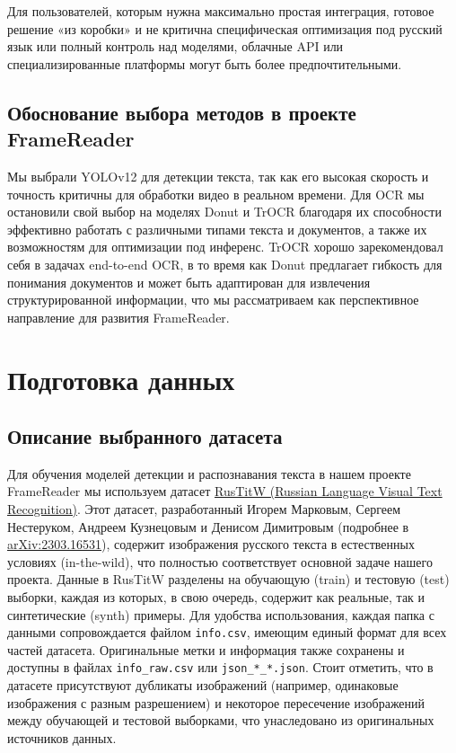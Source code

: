 \documentclass[12pt, a4paper]{article}
\theoremstyle{definition}
\theoremstyle{remark}
\begin{document}
	Для пользователей, которым нужна максимально простая интеграция, готовое решение «из коробки» и не критична специфическая оптимизация под русский язык или полный контроль над моделями, облачные API или специализированные платформы могут быть более предпочтительными.
	
	\subsection{Обоснование выбора методов в проекте FrameReader}
	Мы выбрали YOLOv12 для детекции текста, так как его высокая скорость и точность критичны для обработки видео в реальном времени. Для OCR мы остановили свой выбор на моделях Donut и TrOCR благодаря их способности эффективно работать с различными типами текста и документов, а также их возможностям для оптимизации под инференс. TrOCR хорошо зарекомендовал себя в задачах end-to-end OCR, в то время как Donut предлагает гибкость для понимания документов и может быть адаптирован для извлечения структурированной информации, что мы рассматриваем как перспективное направление для развития FrameReader.
	
	\section{Подготовка данных}
	\subsection{Описание выбранного датасета}
	Для обучения моделей детекции и распознавания текста в нашем проекте FrameReader мы используем датасет \href{https://www.kaggle.com/datasets/hardtype/rustitw-russian-language-visual-text-recognition}{RusTitW (Russian Language Visual Text Recognition)}. Этот датасет, разработанный Игорем Марковым, Сергеем Нестеруком, Андреем Кузнецовым и Денисом Димитровым (подробнее в \href{https://arxiv.org/abs/2303.16531}{arXiv:2303.16531}), содержит изображения русского текста в естественных условиях (in-the-wild), что полностью соответствует основной задаче нашего проекта. Данные в RusTitW разделены на обучающую (train) и тестовую (test) выборки, каждая из которых, в свою очередь, содержит как реальные, так и синтетические (synth) примеры. Для удобства использования, каждая папка с данными сопровождается файлом \texttt{info.csv}, имеющим единый формат для всех частей датасета. Оригинальные метки и информация также сохранены и доступны в файлах \texttt{info\_raw.csv} или \texttt{json\_*\_*.json}. Стоит отметить, что в датасете присутствуют дубликаты изображений (например, одинаковые изображения с разным разрешением) и некоторое пересечение изображений между обучающей и тестовой выборками, что унаследовано из оригинальных источников данных.
	
\end{document}
